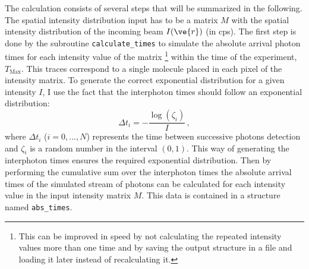 The calculation consists of several steps that will be summarized in the following. 
The spatial intensity distribution input has to be a matrix $M$ with the spatial intensity distribution of the incoming beam $I(\ve{r})$ (in cps). 
The first step is done by the subroutine \texttt{calculate\_times} to simulate the absolute arrival photon times for each intensity value of the matrix 
\footnote{This can be improved in speed by not calculating the repeated intensity values more than one time and by saving the output structure in a file and loading it later instead of recalculating it.} 
within the time of the experiment, $T_{\mbox{Max}}$. This traces correspond to a single molecule placed in each pixel of the intensity matrix.
To generate the correct exponential distribution for a given intensity $I$, I use the fact that the interphoton times should follow an exponential distribution:
\begin{equation}
\Delta t_{i} = -\frac{\log\left(\zeta_i \right)}{I} \, ,
\label{eq:interphoton_simulation}
\end{equation}
where $\Delta t_{i}$ ($i=0,...,N$) represents the time between successive photons detection and $\zeta_i$ is a random number in the interval $(0,1)$. 
This way of generating the interphoton times ensures the required exponential distribution. Then by performing the cumulative sum over the interphoton times the absolute arrival times of the simulated stream of photons can be calculated for each intensity value in the input intensity matrix $M$. This data is contained in a structure named \texttt{abs\_times}. 

